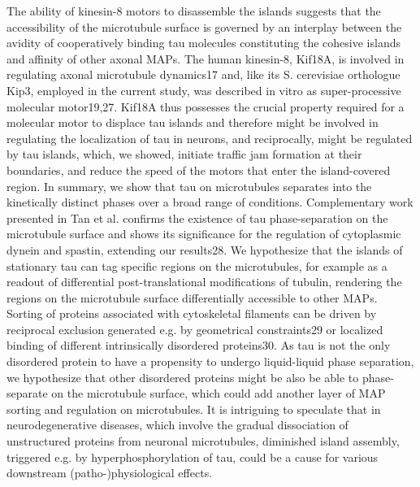 The ability of kinesin-8 motors to disassemble the islands suggests that the accessibility of the microtubule surface is governed by an interplay between the avidity of cooperatively binding tau molecules constituting the cohesive islands and affinity of other axonal MAPs. The human kinesin-8, Kif18A, is involved in regulating axonal microtubule dynamics17 and, like its S. cerevisiae orthologue Kip3, employed in the current study, was described in vitro as super-processive molecular motor19,27. Kif18A thus possesses the crucial property required for a molecular motor to displace tau islands and therefore might be involved in regulating the localization of tau in neurons, and reciprocally, might be regulated by tau islands, which, we showed, initiate traffic jam formation at their boundaries, and reduce the speed of the motors that enter the island-covered region. 
In summary, we show that tau on microtubules separates into the kinetically distinct phases over a broad range of conditions. Complementary work presented in Tan et al. confirms the existence of tau phase-separation on the microtubule surface and shows its significance for the regulation of cytoplasmic dynein and spastin, extending our results28. We hypothesize that the islands of stationary tau can tag specific regions on the microtubules, for example as a readout of differential post-translational modifications of tubulin, rendering the regions on the microtubule surface differentially accessible to other MAPs. Sorting of proteins associated with cytoskeletal filaments can be driven by reciprocal exclusion generated e.g. by geometrical constraints29 or localized binding of different intrinsically disordered proteins30. As tau is not the only disordered protein to have a propensity to undergo liquid-liquid phase separation, we hypothesize that other disordered proteins might be also be able to phase-separate on the microtubule surface, which could add another layer of MAP sorting and regulation on microtubules. It is intriguing to speculate that in neurodegenerative diseases, which involve the gradual dissociation of unstructured proteins from neuronal microtubules, diminished island assembly, triggered e.g. by hyperphosphorylation of tau, could be a cause for various downstream (patho-)physiological effects. 

